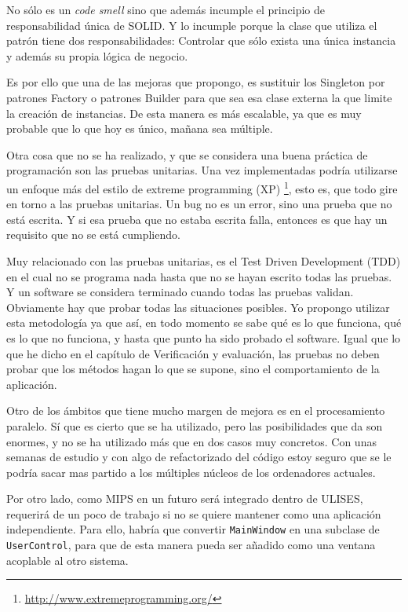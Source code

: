 No s\'olo es un \emph{code smell} sino que adem\'as incumple el principio de 
responsabilidad \'unica de SOLID. Y lo incumple porque la clase que utiliza el 
patr\'on tiene dos responsabilidades: Controlar que s\'olo exista una \'unica 
instancia y adem\'as su propia l\'ogica de negocio. 

Es por ello que una de las mejoras que propongo, es sustituir los Singleton por 
patrones Factory o patrones Builder para que sea esa clase externa la que 
limite la creaci\'on de instancias. De esta manera es m\'as escalable, ya que 
es muy probable que lo que hoy es \'unico, ma\~nana sea m\'ultiple. 

Otra cosa que no se ha realizado, y que se considera una buena pr\'actica de 
programaci\'on son las pruebas unitarias. Una vez implementadas podr\'ia 
utilizarse un enfoque m\'as del estilo de extreme programming (XP) 
\footnote{\url{http://www.extremeprogramming.org/}}, esto es, que todo gire
en torno a las pruebas unitarias. Un bug no es un error, sino una prueba que no 
est\'a escrita. Y si esa prueba que no estaba escrita falla, entonces es que 
hay un requisito que no se est\'a cumpliendo.

Muy relacionado con las pruebas unitarias, es el Test Driven Development (TDD) 
en el cual no se programa nada hasta que no se hayan escrito todas las pruebas. 
Y un software se considera terminado cuando todas las pruebas validan. 
Obviamente hay que probar todas las situaciones posibles. Yo propongo utilizar 
esta metodolog\'ia ya que as\'i, en todo momento se sabe qu\'e es lo que 
funciona, qu\'e es lo que no funciona, y hasta que punto ha sido probado el 
software. Igual que lo que he dicho en el cap\'itulo de Verificaci\'on y  
evaluaci\'on, las pruebas no deben probar que los m\'etodos hagan lo que se 
supone, sino el comportamiento de la aplicaci\'on.

Otro de los \'ambitos que tiene mucho margen de mejora es en el procesamiento 
paralelo. S\'i que es cierto que se ha utilizado, pero las posibilidades que da 
son enormes, y no se ha utilizado m\'as que en dos casos muy concretos. Con 
unas semanas de estudio y con algo de refactorizado del c\'odigo estoy seguro
que se le podr\'ia sacar mas partido a los m\'ultiples n\'ucleos de los 
ordenadores actuales.

Por otro lado, como MIPS en un futuro ser\'a 
integrado dentro de ULISES, requerir\'a de un poco de trabajo 
si no se quiere mantener como una aplicaci\'on independiente. Para ello, 
habr\'ia que convertir \texttt{MainWindow} en una subclase de 
\texttt{UserControl}, para que de esta manera pueda ser a\~nadido como una 
ventana acoplable al otro sistema.

